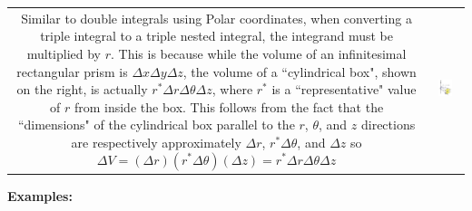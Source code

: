 \documentclass{article}
\begin{document}
\begin{tabular}{cc}
\parbox{0.5\textwidth}{
Similar to double integrals using Polar coordinates, when converting a triple integral to a triple nested integral, the integrand must be multiplied by \(r\). This is because while the volume of an infinitesimal rectangular prism is \(\Delta x \Delta y \Delta z\), the volume of a ``cylindrical box", shown on the right, is actually \(r^* \Delta r \Delta \theta \Delta z\), where \(r^*\) is a ``representative" value of \(r\) from inside the box. This follows from the fact that the ``dimensions" of the cylindrical box parallel to the \(r\), \(\theta\), and \(z\) directions are respectively approximately \(\Delta r\), \(r^* \Delta\theta\), and \(\Delta z\) so
\[\Delta V = (\Delta r)(r^* \Delta\theta)(\Delta z) = r^* \Delta r \Delta\theta \Delta z\]
} & \parbox{0.5\textwidth}{
\includegraphics[width = 0.5\textwidth]{cylindrical_box}
}
\end{tabular}

\textbf{Examples:}
\end{document}
